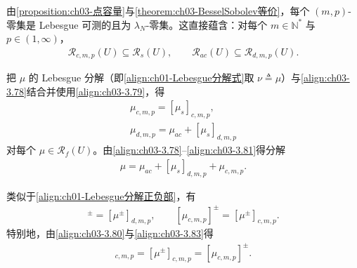 \documentclass[../../main.tex]{subfiles}%
\begin{document}
由\cref{proposition:ch03-点容量}与\cref{theorem:ch03-BesselSobolev等价}，每个 $(m,p)$-零集是 Lebesgue 可测的且为 $\lambda_N$-零集。这直接蕴含：对每个 $m\in\mathbb{N}^*$ 与 $p\in(1,\infty)$，
\begin{align}
\mathscr{R}_{c,m,p}(U)\subseteq\mathscr{R}_s(U),\qquad
\mathscr{R}_{ac}(U)\subseteq\mathscr{R}_{d,m,p}(U).\label{align:ch03-3.79}
\end{align}

把 $\mu$ 的 Lebesgue 分解（即\eqref{align:ch01-Lebesgue分解式}取 $\nu\triangleq\mu$）与\eqref{align:ch03-3.78}结合并使用\eqref{align:ch03-3.79}，得
\begin{align}
\mu_{c,m,p}=[\mu_s]_{c,m,p},\label{align:ch03-3.80}\\
\mu_{d,m,p}=\mu_{ac}+[\mu_s]_{d,m,p}\label{align:ch03-3.81}
\end{align}
对每个 $\mu\in\mathscr{R}_f(U)$。由\eqref{align:ch03-3.78}--\eqref{align:ch03-3.81}得分解
\begin{align}
\mu=\mu_{ac}+[\mu_s]_{d,m,p}+\mu_{c,m,p}.\label{align:ch03-3.82}
\end{align}

\begin{remark}\label{remark:ch03-分解正负}
类似于\eqref{align:ch01-Lebesgue分解正负部}，有
\begin{align}
[\mu_{d,m,p}]^\pm=[\mu^\pm]_{d,m,p},\qquad
[\mu_{c,m,p}]^\pm=[\mu^\pm]_{c,m,p}.\label{align:ch03-3.83}
\end{align}
特别地，由\eqref{align:ch03-3.80}与\eqref{align:ch03-3.83}得
\begin{align}
[\mu_s^\pm]_{c,m,p}=[\mu^\pm]_{c,m,p}=[\mu_{c,m,p}]^\pm.\label{align:ch03-3.84}
\end{align}
\end{remark}
\end{document}
